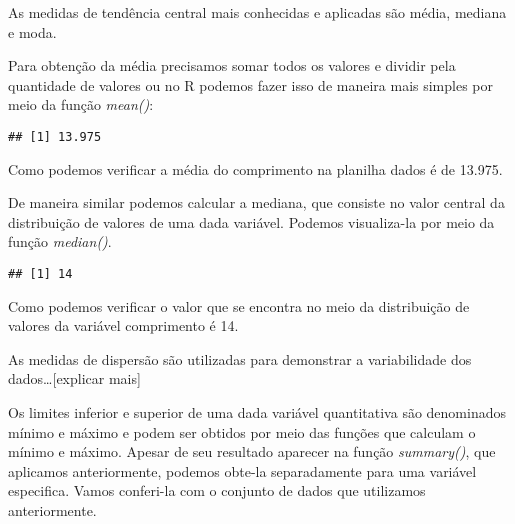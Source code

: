 \documentclass[]{book}
\newenvironment{Shaded}{\begin{snugshade}}{\end{snugshade}}
\newcommand{\KeywordTok}[1]{\textcolor[rgb]{0.13,0.29,0.53}{\textbf{#1}}}
\newcommand{\NormalTok}[1]{#1}
\newcommand{\OperatorTok}[1]{\textcolor[rgb]{0.81,0.36,0.00}{\textbf{#1}}}
\begin{document}
As medidas de tendência central mais conhecidas e aplicadas são média, mediana e moda.

Para obtenção da média precisamos somar todos os valores e dividir pela quantidade de valores ou no R podemos fazer isso de maneira mais simples por meio da função \emph{mean()}:

\begin{Shaded}
\end{Shaded}

\begin{verbatim}
## [1] 13.975
\end{verbatim}

Como podemos verificar a média do comprimento na planilha dados é de 13.975.

De maneira similar podemos calcular a mediana, que consiste no valor central da distribuição de valores de uma dada variável. Podemos visualiza-la por meio da função \emph{median()}.

\begin{Shaded}
\end{Shaded}

\begin{verbatim}
## [1] 14
\end{verbatim}

Como podemos verificar o valor que se encontra no meio da distribuição de valores da variável comprimento é 14.

As medidas de dispersão são utilizadas para demonstrar a variabilidade dos dados\ldots{}{[}explicar mais{]}

Os limites inferior e superior de uma dada variável quantitativa são denominados mínimo e máximo e podem ser obtidos por meio das funções que calculam o mínimo e máximo. Apesar de seu resultado aparecer na função \emph{summary()}, que aplicamos anteriormente, podemos obte-la separadamente para uma variável especifica. Vamos conferi-la com o conjunto de dados que utilizamos anteriormente.

\begin{Shaded}
\end{Shaded}
\end{document}
